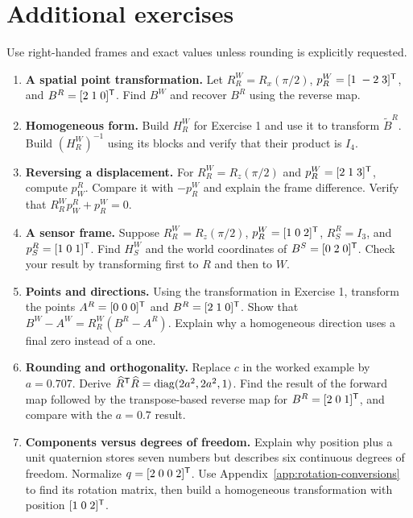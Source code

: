 \section{Additional exercises}
Use right-handed frames and exact values unless rounding is explicitly requested.
\begin{enumerate}
\item \textbf{A spatial point transformation.}
Let $R_R^W=R_x(\pi/2)$, $p_R^W=[1\;-2\;3]^{\mathsf T}$, and
$B^R=[2\;1\;0]^{\mathsf T}$. Find $B^W$ and recover $B^R$ using the reverse map.

\item \textbf{Homogeneous form.}
Build $H_R^W$ for Exercise 1 and use it to transform $\widetilde B^R$.
Build $(H_R^W)^{-1}$ using its blocks and verify that their product is $I_4$.

\item \textbf{Reversing a displacement.}
For $R_R^W=R_z(\pi/2)$ and $p_R^W=[2\;1\;3]^{\mathsf T}$, compute $p_W^R$.
Compare it with $-p_R^W$ and explain the frame difference. Verify that
$R_R^W p_W^R+p_R^W=0$.

\item \textbf{A sensor frame.}
Suppose $R_R^W=R_z(\pi/2)$, $p_R^W=[1\;0\;2]^{\mathsf T}$,
$R_S^R=I_3$, and $p_S^R=[1\;0\;1]^{\mathsf T}$.
Find $H_S^W$ and the world coordinates of $B^S=[0\;2\;0]^{\mathsf T}$.
Check your result by transforming first to $R$ and then to $W$.

\item \textbf{Points and directions.}
Using the transformation in Exercise 1, transform the points
$A^R=[0\;0\;0]^{\mathsf T}$ and $B^R=[2\;1\;0]^{\mathsf T}$.
Show that $B^W-A^W=R_R^W(B^R-A^R)$.
Explain why a homogeneous direction uses a final zero instead of a one.

\item \textbf{Rounding and orthogonality.}
Replace $c$ in the worked example by $a=0.707$.
Derive $\widehat R^{\mathsf T}\widehat R=\operatorname{diag}(2a^2,2a^2,1)$.
Find the result of the forward map followed by the transpose-based reverse
map for $B^R=[2\;0\;1]^{\mathsf T}$, and compare with the $a=0.7$ result.

\item \textbf{Components versus degrees of freedom.}
Explain why position plus a unit quaternion stores seven numbers but describes
six continuous degrees of freedom. Normalize $q=[2\;0\;0\;2]^{\mathsf T}$.
Use Appendix~\ref{app:rotation-conversions} to find its rotation matrix,
then build a homogeneous transformation with position $[1\;0\;2]^{\mathsf T}$.
\end{enumerate}

